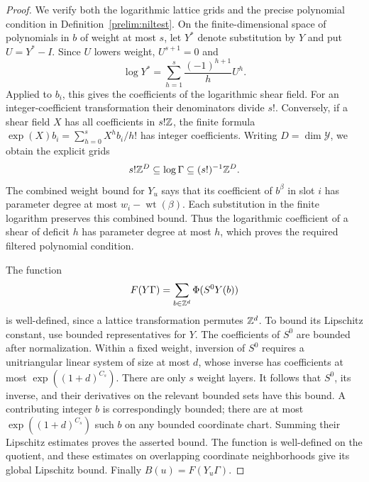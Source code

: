 \begin{proof}
We verify both the logarithmic lattice grids and the precise polynomial
condition in Definition~\ref{prelim:niltest}.  On the finite-dimensional
space of polynomials in $b$ of weight at most $s$, let $Y^*$ denote
substitution by $Y$ and put $U=Y^*-I$.  Since $U$ lowers weight,
$U^{s+1}=0$ and
\[
 \log Y^*=\sum_{h=1}^s\frac{(-1)^{h+1}}h U^h.
\]
Applied to $b_i$, this gives the coefficients of the logarithmic shear
field.  For an integer-coefficient transformation their denominators
divide $s!$.  Conversely, if a shear field $X$ has all coefficients
in $s!\mathbb Z$, the finite formula
$\exp(X)b_i=\sum_{h=0}^sX^hb_i/h!$ has integer coefficients.
Writing $D=\dim\mathcal Y$, we obtain the explicit grids
\[
 s!\mathbb Z^D\subseteq\log\Gamma\subseteq(s!)^{-1}\mathbb Z^D.
\]
The combined weight bound for $Y_u$ says that its coefficient of
$b^\beta$ in slot $i$ has parameter degree at most
$w_i-\operatorname{wt}(\beta)$.  Each substitution in the finite
logarithm preserves this combined bound.  Thus the logarithmic
coefficient of a shear of deficit $h$ has parameter degree at most $h$,
which proves the required filtered polynomial condition.

The function
\[
 F(Y\Gamma)=\sum_{b\in\mathbb Z^d}\Phi(S^0Y(b))
\]
is well-defined, since a lattice transformation permutes $\mathbb Z^d$.
To bound its Lipschitz constant, use bounded representatives for $Y$.
The coefficients of $S^0$ are bounded after normalization.  Within a
fixed weight, inversion of $S^0$ requires a unitriangular linear system
of size at most $d$, whose inverse has coefficients at most
$\exp((1+d)^{C_s})$.  There are only $s$ weight layers.  It follows that
$S^0$, its inverse, and their derivatives on the relevant bounded sets
have this bound.  A contributing integer $b$ is correspondingly bounded;
there are at most $\exp((1+d)^{C_s})$ such $b$ on any bounded coordinate
chart.  Summing their Lipschitz estimates proves the asserted bound.
The function is well-defined on the quotient, and these estimates
on overlapping coordinate neighborhoods give its global Lipschitz bound.
Finally $B(u)=F(Y_u\Gamma)$.


\end{proof}
